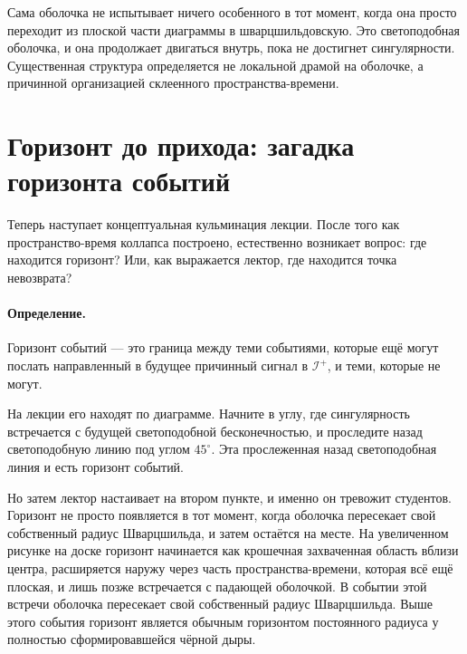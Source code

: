 Сама оболочка не испытывает ничего особенного в тот момент, когда она просто переходит из плоской части диаграммы в шварцшильдовскую. Это светоподобная оболочка, и она продолжает двигаться внутрь, пока не достигнет сингулярности. Существенная структура определяется не локальной драмой на оболочке, а причинной организацией склеенного пространства-времени.

\begin{classroomqa}
\end{classroomqa}

\section{Горизонт до прихода: загадка горизонта событий}

Теперь наступает концептуальная кульминация лекции. После того как пространство-время коллапса построено, естественно возникает вопрос: где находится горизонт? Или, как выражается лектор, где находится точка невозврата?

\paragraph{Определение.} Горизонт событий — это граница между теми событиями, которые ещё могут послать направленный в будущее причинный сигнал в \(\mathcal{I}^+\), и теми, которые не могут.

На лекции его находят по диаграмме. Начните в углу, где сингулярность встречается с будущей светоподобной бесконечностью, и проследите назад светоподобную линию под углом \(45^\circ\). Эта прослеженная назад светоподобная линия и есть горизонт событий.

Но затем лектор настаивает на втором пункте, и именно он тревожит студентов. Горизонт не просто появляется в тот момент, когда оболочка пересекает свой собственный радиус Шварцшильда, и затем остаётся на месте. На увеличенном рисунке на доске горизонт начинается как крошечная захваченная область вблизи центра, расширяется наружу через часть пространства-времени, которая всё ещё плоская, и лишь позже встречается с падающей оболочкой. В событии этой встречи оболочка пересекает свой собственный радиус Шварцшильда. Выше этого события горизонт является обычным горизонтом постоянного радиуса у полностью сформировавшейся чёрной дыры.

